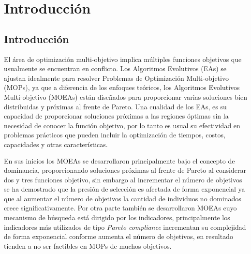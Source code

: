 
\chapter{Introducción} %

\label{Chapter1} %


\newcommand{\keyword}[1]{\textbf{#1}}
\newcommand{\tabhead}[1]{\textbf{#1}}
\newcommand{\code}[1]{\texttt{#1}}
\newcommand{\file}[1]{\texttt{\bfseries#1}}
\newcommand{\option}[1]{\texttt{\itshape#1}}

\section{Introducción}

El área de optimización multi-objetivo implica múltiples funciones objetivos que usualmente se encuentran en conflicto.
%
Los Algoritmos Evolutivos (EAs) se ajustan idealmente para resolver Problemas de Optimización Multi-objetivo (MOPs), ya que a diferencia de los enfoques teóricos, los Algoritmos Evolutivos Multi-objetivo (MOEAs) están diseñados para proporcionar varias soluciones bien distribuidas y próximas al frente de Pareto.
%
Una cualidad de los EAs, es su capacidad de proporcionar soluciones próximas a las regiones óptimas sin la necesidad de conocer la función objetivo, por lo tanto es usual su efectividad en problemas prácticos que pueden incluir la optimización de tiempos, costos, capacidades y otras características.
%


En sus inicios los MOEAs se desarrollaron principalmente bajo el concepto de dominancia, proporcionando soluciones próximas al frente de Pareto al considerar dos y tres funciones objetivo, sin embargo al incrementar el número de objetivos se ha demostrado que la presión de selección es afectada de forma exponencial ya que al aumentar el número de objetivos la cantidad de individuos no dominados crece significativamente.
%
Por otra parte también se desarrollaron MOEAs cuyo mecanismo de búsqueda está dirigido por los indicadores, principalmente los indicadores más utilizados de tipo \textit{Pareto compliance} incrementan su complejidad de forma exponencial conforme aumenta el número de objetivos, en resultado tienden a no ser factibles en MOPs de muchos objetivos.
%


